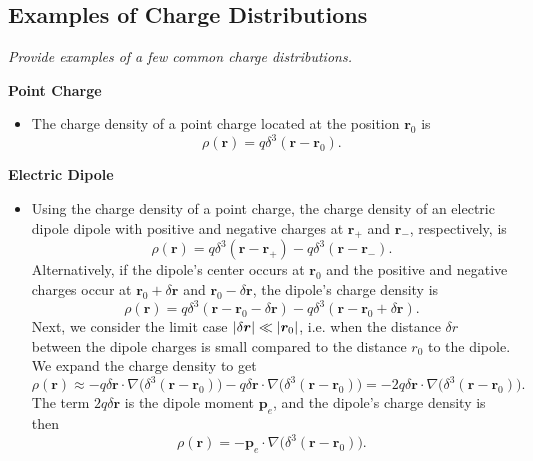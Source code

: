 \documentclass[11pt, a4paper]{article}
\renewcommand{\vec}[1]{\bm{#1}} %
\renewcommand{\r}{\vec{r}}
\newcommand{\pe}{\vec{p}_{e}}  %
\renewcommand{\grad}{\nabla}
\begin{document}
\subsection{Examples of Charge Distributions}
\textit{Provide examples of a few common charge distributions.}
    
\vspace{2mm}
\textbf{Point Charge} 
\begin{itemize}
	\item The charge density of a point charge located at the position $ \r_{0} $ is
	\begin{equation*}
		\rho (\r) = q \delta^{3}(\r - \r_{0}).
	\end{equation*}
\end{itemize}	
	

\textbf{Electric Dipole} 
\begin{itemize}
	\item Using the charge density of a point charge, the charge density of an electric dipole dipole with positive and negative charges at $ \r_{+} $ and $ \r_{-} $, respectively, is
	\begin{equation*}
		\rho(\r) = q \delta^{3}(\r - \r_{+}) - q \delta^{3}(\r - \r_{-}).
	\end{equation*}
	Alternatively, if the dipole's center occurs at $ \r_{0} $ and the positive and negative charges occur at $ \r_{0} + \delta \r$ and $ \r_{0} - \delta \r $, the dipole's charge density is
	\begin{equation*}
		\rho(\r) = q \delta^{3}(\r - \r_{0} - \delta \r) - q\delta^{3}(\r - \r_{0} + \delta \r).
	\end{equation*}
	Next, we consider the limit case $ \abs{\delta \r} \ll \abs{\r_{0}} $, i.e. when the distance $ \delta r $ between the dipole charges is small compared to the distance $ r_{0} $ to the dipole. We expand the charge density to get
	\begin{equation*}
		\rho(\r) \approx - q \delta \r \cdot \grad \big(\delta^{3}(\r - \r_{0})\big) - q \delta \r \cdot \grad \big(\delta^{3}(\r - \r_{0})\big) = -2 q \delta \r \cdot \grad \big(\delta^{3}(\r - \r_{0})\big).
	\end{equation*}
	The term $ 2q\delta \r $ is the dipole moment $ \pe $, and the dipole's charge density is then
	\begin{equation*}
		\rho(\r) = -\pe \cdot \grad \big(\delta^{3}(\r - \r_{0})\big).
	\end{equation*}

\end{itemize}
\end{document}
